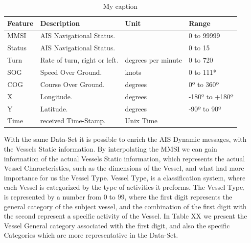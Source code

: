 \begin{table}[H]
\centering
\caption{My caption}
\label{Table: Data-Set Features}
\begin{tabular}{@{}llll@{}}
\toprule
Feature & Description                  & Unit               & Range          \\ \midrule
MMSI    & AIS Navigational Status.     &                    & 0 to 99999     \\
Status  & AIS Navigational Status.     &                    & 0 to 15        \\
Turn    & Rate of turn, right or left. & degrees per minute & 0 to 720       \\
SOG     & Speed Over Ground.           & knots              & 0 to 111*      \\
COG     & Course Over Ground.          & degrees            & 0º to 360º     \\
X       & Longitude.                   & degrees            & -180º to +180º \\
Y       & Latitude.                    & degrees            & -90º to 90º    \\
Time    & received Time-Stamp.         & Unix Time          &                \\ \bottomrule
\end{tabular}
\end{table}

With the same Data-Set it is possible to enrich the AIS Dynamic messages, with the Vessels Static information. By interpolating the MMSI we can gain information of the actual Vessels Static information, which represents the actual Vessel Characteristics, such as the dimensions of the Vessel, and what had more importance for us the Vessel Type.
Vessel Type, is a classification system, where each Vessel is categorized by the type of activities it preforms. The Vessel Type, is represented by a number from 0 to 99, where the first digit represents the general category of the subject vessel, and the combination of the first digit with the second represent a specific activity of the Vessel. In Table XX we present the Vessel General category associated with the first digit, and also the specific Categories which are more representative in the Data-Set.

